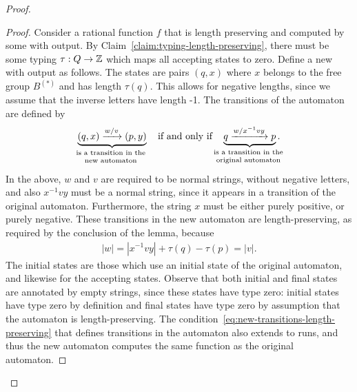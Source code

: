 \begin{proof}
\begin{proof}
        Consider a rational function $f$ that is length preserving and computed by some \nfa with output. By Claim~\ref{claim:typing-length-preserving}, there must be some typing $\tau : Q \to {\mathbb Z}$ which maps all accepting states to zero. Define a new \nfa with output as follows. The  states are pairs $(q, x)$ where $x$ belongs to the free group $B^{(*)}$ and has length $\tau(q)$. This allows for negative lengths, since we assume that the inverse letters have length -1.  The transitions of the automaton are defined by  
        \begin{align}\label{eq:new-transitions-length-preserving}
         \myunderbrace{(q,x) \xrightarrow { w / v} (p,y)}{is a transition in the \\ new automaton} \quad \text{if and only if} \quad         \myunderbrace{q \xrightarrow { w / x^{-1} v y} p}{is a transition in the \\ original automaton}.
        \end{align}
        In the above, $w$ and $v$ are required to be normal strings, without negative letters, and also $x^{-1} v y$ must be a normal string, since it appears in a transition of the original automaton. Furthermore, the string $x$ must be either purely positive, or purely negative. 
        These transitions in the new automaton are length-preserving, as required by the conclusion of  the lemma, because 
        \begin{align*}
        |w| = |x^{-1} v y| + \tau(q) - \tau(p) = |v|.
        \end{align*}
        The initial states are those which use an initial state of the original automaton, and likewise for the accepting states. Observe that both initial and final states are annotated by empty strings, since these states have type zero: initial states have type zero by definition and final states have type zero by assumption that the automaton is length-preserving. The condition~\eqref{eq:new-transitions-length-preserving} that defines transitions in the automaton also extends to runs, and thus the new automaton computes the same function as the original automaton.
    \end{proof}


\end{proof}
